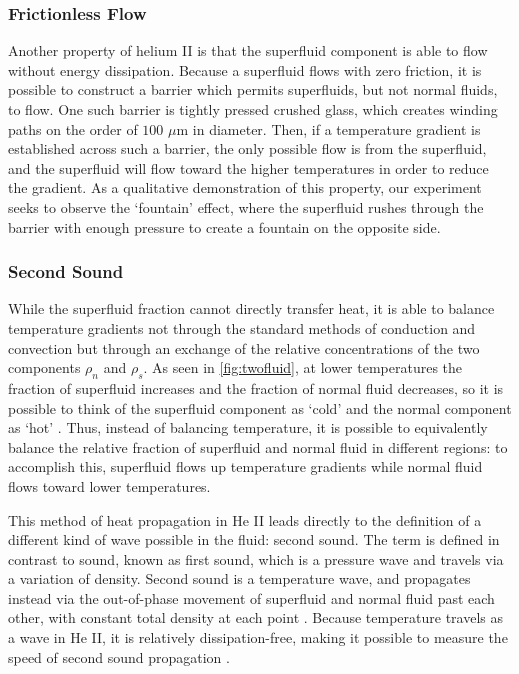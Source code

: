 \subsubsection{Frictionless Flow}\label{frictionlessflow}
Another property of helium II is that the superfluid component is able
to flow without energy dissipation. Because a superfluid flows with
zero friction, it is possible to construct a barrier which permits
superfluids, but not normal fluids, to flow. One such barrier is
tightly pressed crushed glass, which creates winding paths on the
order of $100$ $\mu$m in diameter. Then, if a temperature gradient is
established across such a barrier, the only possible flow is from the
superfluid, and the superfluid will flow toward the higher
temperatures in order to reduce the gradient. As a qualitative
demonstration of this property, our experiment seeks to observe the
`fountain' effect, where the superfluid rushes through the barrier
with enough pressure to create a fountain on the opposite side.

\subsubsection{Second Sound}\label{secondsound}
While the superfluid fraction cannot directly transfer heat, it
is able to balance temperature gradients not through the standard
methods of conduction and convection but through an exchange of the
relative concentrations of the two components $\rho_n$ and
$\rho_s$. As seen in \ref{fig:twofluid}, at lower temperatures the
fraction of superfluid increases and the fraction of normal fluid
decreases, so it is possible to think of the superfluid component as
`cold' and the normal component as `hot' \cite{atkins}. Thus, instead
of balancing temperature, it is possible to equivalently balance the
relative fraction of superfluid and normal fluid in different regions:
to accomplish this, superfluid flows up temperature gradients while
normal fluid flows toward lower temperatures.

This method of heat propagation in He II leads directly to the
definition of a different kind of wave possible in the fluid: second
sound. The term is defined in contrast to sound, known as first sound,
which is a pressure wave and travels via a variation of
density. Second sound is a temperature wave, and propagates instead
via the out-of-phase movement of superfluid and normal fluid past each
other, with constant total density at each point
\cite{atkins}. Because temperature travels as a wave in He II, it is
relatively dissipation-free, making it possible to measure the speed
of second sound propagation \cite{atkins}.

